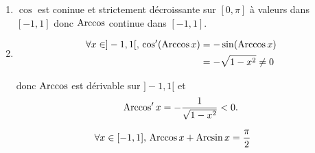 \begin{prv}
	\begin{enumerate}
		\item $\cos$ est coninue et strictement décroissante sur $[0,\pi]$ à valeurs dans $[-1,1]$ donc $\operatorname{Arccos}$ continue dans $[-1,1]$.
		\item
			\begin{align*}
				\forall x \in ]-1,1[,\,
				\cos'(\operatorname{Arccos} x) &= -\sin(\operatorname{Arccos} x) \\
				&= -\sqrt{1-x^2} \neq 0 \\
			\end{align*}

			donc $\operatorname{Arccos}$ est dérivable sur $]-1,1[$ et \[
				\operatorname{Arccos}' x = -\frac{1}{\sqrt{1-x^2}} < 0.
			\]
	\end{enumerate}
\end{prv}

\begin{crlr}
	\[
		\forall x \in [-1,1],\,\operatorname{Arccos} x + \operatorname{Arcsin} x = \frac{\pi}{2}
	\] 
\end{crlr}

